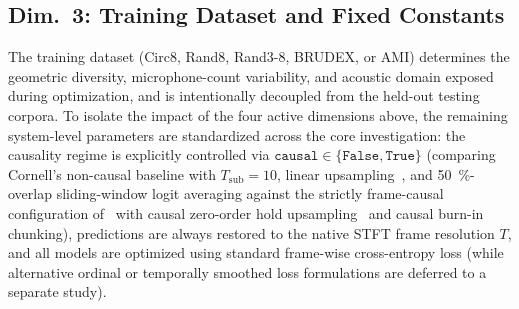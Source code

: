 \documentclass[lettersize,journal]{IEEEtran}
\begin{document}
\subsection{Dim.~3: Training Dataset and Fixed Constants}
\label{sec:dim_training_constants}
The training dataset (Circ8, Rand8, Rand3-8, \gls{BRUDEX}, or \gls{AMI}) determines the geometric diversity, microphone-count variability, and acoustic domain exposed during optimization, and is intentionally decoupled from the held-out testing corpora. To isolate the impact of the four active dimensions above, the remaining system-level parameters are standardized across the core investigation: the causality regime is explicitly controlled via $\texttt{causal} \in \{\texttt{False}, \texttt{True}\}$ (comparing Cornell's non-causal baseline with $T_{\mathrm{sub}} = 10$, linear upsampling~, and \SI{50}{\percent}-overlap sliding-window logit averaging against the strictly frame-causal configuration of~ with causal zero-order hold upsampling~ and causal burn-in chunking), predictions are always restored to the native \gls{STFT} frame resolution $T$, and all models are optimized using standard frame-wise cross-entropy loss (while alternative ordinal or temporally smoothed loss formulations are deferred to a separate study).
\end{document}
